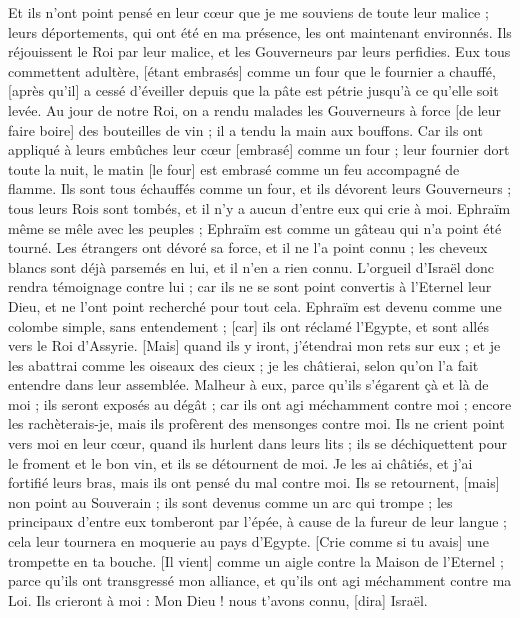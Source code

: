 \begin{multicols}{2}
Et ils n'ont point pensé en leur cœur que je me souviens de toute leur malice ; leurs déportements, qui ont été en ma présence, les ont maintenant environnés.
Ils réjouissent le Roi par leur malice, et les Gouverneurs par leurs perfidies.
Eux tous commettent adultère, [étant embrasés] comme un four que le fournier a chauffé, [après qu'il] a cessé d'éveiller depuis que la pâte est pétrie jusqu'à ce qu'elle soit levée.
Au jour de notre Roi, on a rendu malades les Gouverneurs à force [de leur faire boire] des bouteilles de vin ; il a tendu la main aux bouffons.
Car ils ont appliqué à leurs embûches leur cœur [embrasé] comme un four ; leur fournier dort toute la nuit, le matin [le four] est embrasé comme un feu accompagné de flamme.
Ils sont tous échauffés comme un four, et ils dévorent leurs Gouverneurs ; tous leurs Rois sont tombés, et il n'y a aucun d'entre eux qui crie à moi.
Ephraïm même se mêle avec les peuples ; Ephraïm est comme un gâteau qui n'a point été tourné.
Les étrangers ont dévoré sa force, et il ne l'a point connu ; les cheveux blancs sont déjà parsemés en lui, et il n'en a rien connu.
L'orgueil d'Israël donc rendra témoignage contre lui ; car ils ne se sont point convertis à l'Eternel leur Dieu, et ne l'ont point recherché pour tout cela.
Ephraïm est devenu comme une colombe simple, sans entendement ; [car] ils ont réclamé l'Egypte, et sont allés vers le Roi d'Assyrie.
[Mais] quand ils y iront, j'étendrai mon rets sur eux ; et je les abattrai comme les oiseaux des cieux ; je les châtierai, selon qu'on l'a fait entendre dans leur assemblée.
Malheur à eux, parce qu'ils s'égarent çà et là de moi ; ils seront exposés au dégât ; car ils ont agi méchamment contre moi ; encore les rachèterais-je, mais ils profèrent des mensonges contre moi.
Ils ne crient point vers moi en leur cœur, quand ils hurlent dans leurs lits ; ils se déchiquettent pour le froment et le bon vin, et ils se détournent de moi.
Je les ai châtiés, et j'ai fortifié leurs bras, mais ils ont pensé du mal contre moi.
Ils se retournent, [mais] non point au Souverain ; ils sont devenus comme un arc qui trompe ; les principaux d'entre eux tomberont par l'épée, à cause de la fureur de leur langue ; cela leur tournera en moquerie au pays d'Egypte.
\VerseOne{}[Crie comme si tu avais] une trompette en ta bouche. [Il vient] comme un aigle contre la Maison de l'Eternel ; parce qu'ils ont transgressé mon alliance, et qu'ils ont agi méchamment contre ma Loi.
Ils crieront à moi : Mon Dieu ! nous t'avons connu, [dira] Israël.

\end{multicols}
